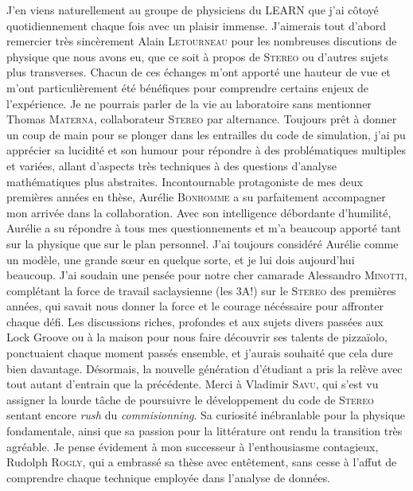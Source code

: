 J'en viens naturellement au groupe de physiciens du LEARN que j'ai côtoyé quotidiennement chaque fois avec un plaisir immense. J'aimerais tout d'abord remercier très sincèrement Alain \textsc{Letourneau} pour les nombreuses discutions de physique que nous avons eu, que ce soit à propos de \textsc{Stereo} ou d'autres sujets plus transverses. Chacun de ces échanges m'ont apporté une hauteur de vue et m'ont particulièrement été bénéfiques pour comprendre certains enjeux de l'expérience. Je ne pourrais parler de la vie au laboratoire sans mentionner Thomas \textsc{Materna}, collaborateur \textsc{Stereo} par alternance. Toujours prêt à donner un coup de main pour se plonger dans les entrailles du code de simulation, j'ai pu apprécier sa lucidité et son humour pour répondre à des problématiques multiples et variées, allant d'aspects très techniques à des questions d'analyse mathématiques plus abstraites. Incontournable protagoniste de mes deux premières années en thèse, Aurélie \textsc{Bonhomme} a su parfaitement accompagner mon arrivée dans la collaboration. Avec son intelligence débordante d'humilité, Aurélie a su répondre à tous mes questionnements et m'a beaucoup apporté tant sur la physique que sur le plan personnel. J'ai toujours considéré Aurélie comme un modèle, une grande s\oe ur en quelque sorte, et je lui dois aujourd'hui beaucoup. J'ai soudain une pensée pour notre cher camarade Alessandro \textsc{Minotti}, complétant la force de travail saclaysienne (les 3A!) sur le \textsc{Stereo} des premières années, qui savait nous donner la force et le courage nécéssaire pour affronter chaque défi. Les discussions riches, profondes et aux sujets divers passées aux Lock Groove ou à la maison pour nous faire découvrir ses talents de pizzaïolo, ponctuaient chaque moment passés ensemble, et j'aurais souhaité que cela dure bien davantage. Désormais, la nouvelle génération d'étudiant a pris la relève avec tout autant d'entrain que la précédente. Merci à Vladimir \textsc{Savu}, qui s'est vu assigner la lourde tâche de poursuivre le développement du code de \textsc{Stereo} sentant encore \textit{rush} du \textit{commisionning}. Sa curiosité inébranlable pour la physique fondamentale, ainsi que sa passion pour la littérature ont rendu la transition très agréable. Je pense évidement à mon successeur à l'enthousiasme contagieux, Rudolph \textsc{Rogly}, qui a embrassé sa thèse avec entêtement, sans cesse à l'affut de comprendre chaque technique employée dans l'analyse de données.\\

